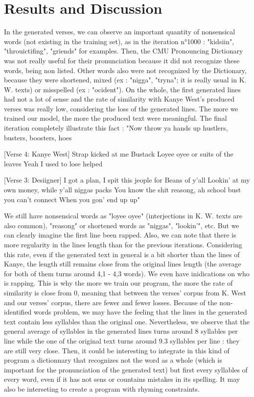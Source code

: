 \documentclass[12pt,a4paper]{article}
\begin{document}
\section{Results and Discussion}

In the generated verses, we can observe an important quantity of nonsensical words (not existing in the training set), as in the iteration n°1000 : "kidsiin", "throuictifing", "griends" for examples. Then, the CMU Pronouncing Dictionary was not really useful for their pronunciation because it did not recognize these words, being non listed. Other words also were not recognized by the Dictionary, because they were shortened, mixed (ex : "nigga", "tryna"; it is really usual in K. W. texts) or misspelled (ex : "ocident"). On the whole, the first generated lines had not a lot of sense and the rate of similarity with Kanye West's produced verses was really low, considering the loss of the generated lines. The more we trained our model, the more the produced text were meaningful. The final iteration completely illustrate this fact : 
"Now throw ya hands up hustlers, busters, boosters, hoes

[Verse 4: Kanye West]
Strap kicked at me Bustack
Loyee oyee or suits of the leaves
Yeah I used to lose helped

[Verse 3: Desiigner]
I got a plan, I spit this jeople for Beans of y'all
Lookin' at my own money, while y'all niggas packs
You know the shit reasong, ah school bust you can't connect
When you gon' end up up"

We still have nonsensical words as "loyee oyee" (interjections in K. W. texts are also common), "reasong" or shortened words as "niggas", "lookin'", etc. But we can clearly imagine the first line been rapped. Also, we can note that there is more regularity in the lines length than for the previous iterations. Considering this rate, even if the generated text in general is a bit shorter than the lines of Kanye, the length still remains close from the original lines length (the average for both of them turns around 4,1 - 4,3 words). We even have inidications on who is rapping. This is why the more we train our program, the more the rate of similarity is close from 0, meaning that between the verses' corpus from K. West and our verses' corpus, there are fewer and fewer losses. Because of the non-identified words problem, we may have the feeling that the lines in the generated text contain less syllables than the original one. Nevertheless, we observe that the general average of syllables in the generated lines turns around 8 syllables per line while the one of the original text turns around 9.3 syllables per line : they are still very close. Then, it could be interesting to integrate in this kind of program a dictionnary that recognizes not the word as a whole (which is important for the pronunciation of the generated text) but first every syllables of every word, even if it has not sens or countains mistakes in its spelling. It may also be interseting to create a program with rhyming constraints.



\end{document}
